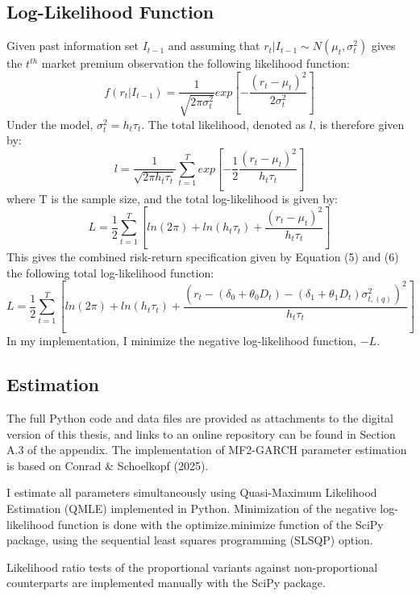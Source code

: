\documentclass[12pt]{article}
\begin{document}
\subsection{Log-Likelihood Function}
Given past information set $I_{t-1}$ and assuming that $r_t | I_{t-1}\sim N(\mu_t,\sigma_t^2)$ gives the $t^{th}$ market premium observation the following likelihood function:
\begin{equation}
\nonumber
f(r_t|I_{t-1})=\frac{1}{\sqrt{2\pi\sigma_t^2}}exp\left[-\frac{(r_t-\mu_t)^2}{2\sigma_t^2}\right]
\end{equation}
Under the model, $\sigma_t^2=h_t\tau_t$. The total likelihood, denoted as $l$, is therefore given by:
\begin{equation}
\nonumber
l=\frac{1}{\sqrt{2\pi h_t\tau_t}}\sum_{t=1}^Texp\left[-\frac{1}{2}\frac{(r_t-\mu_t)^2}{h_t\tau_t}\right]
\end{equation}
where T is the sample size, and the total log-likelihood is given by:
\begin{equation}
\nonumber
L=\frac{1}{2}\sum_{t=1}^T[ln(2\pi)+ln(h_t\tau_t)+\frac{(r_t-\mu_t)^2}{h_t\tau_t}]
\end{equation}
This gives the combined risk-return specification given by Equation (5) and (6) the following  total log-likelihood function:
\begin{equation}
L=\frac{1}{2}\sum_{t=1}^T[ln(2\pi)+ln(h_t\tau_t)+\frac{(r_t-(\delta_0+\theta_0D_t)-(\delta_1+\theta_1D_t)\sigma_{t,(q)}^2)^2}{h_t\tau_t}]
\end{equation}
In my implementation, I minimize the negative log-likelihood function, $-L$.
\subsection{Estimation}
The full Python code and data files are provided as attachments to the digital version of this thesis, and links to an online repository can be found in Section A.3 of the appendix. The implementation of MF2-GARCH parameter estimation is based on Conrad \& Schoelkopf (2025).\par
I estimate all parameters simultaneously using Quasi-Maximum Likelihood Estimation (QMLE) implemented in Python. Minimization of the negative log-likelihood function is done with the optimize.minimize function of the SciPy package, using the sequential least squares programming (SLSQP) option.\par
Likelihood ratio tests of the proportional variants against non-proportional counterparts are implemented manually with the SciPy package. 
\end{document}
